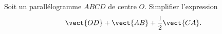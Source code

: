 
\begin{exercice}\label{exosmath-0199}

    Soit un parallélogramme \( ABCD\) de centre \( O\). Simplifier l'expression
    \begin{equation}
        \vect{ OD }+\vect{ AB }+\frac{ 1 }{2}\vect{ CA }.
    \end{equation}

\end{exercice}
